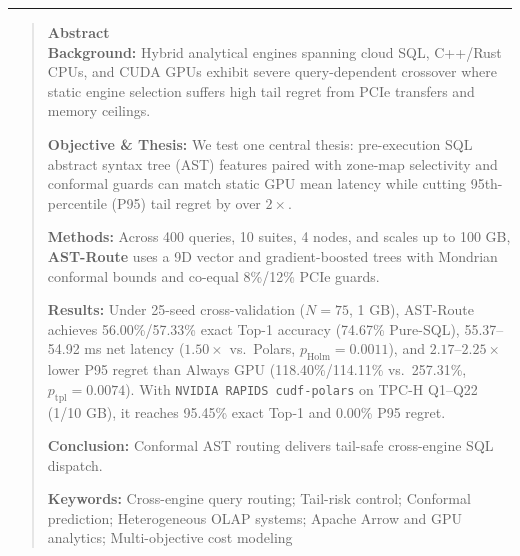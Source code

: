 \documentclass[10pt,a4paper]{article}
\begin{document}
\noindent\rule{\textwidth}{0.8pt}
\begin{quote}
\small\sffamily
\textbf{\color{springerblue}Abstract}\\[0.3em]
\textbf{Background:} Hybrid analytical engines spanning cloud SQL, C++/Rust CPUs, and CUDA GPUs exhibit severe query-dependent crossover where static engine selection suffers high tail regret from PCIe transfers and memory ceilings.

\textbf{Objective \& Thesis:} We test one central thesis: pre-execution SQL abstract syntax tree (AST) features paired with zone-map selectivity and conformal guards can match static GPU mean latency while cutting 95th-percentile (P95) tail regret by over $2\times$.

\textbf{Methods:} Across 400 queries, 10 suites, 4 nodes, and scales up to 100 GB, \textbf{AST-Route} uses a 9D vector and gradient-boosted trees with Mondrian conformal bounds and co-equal 8\%/12\% PCIe guards.

\textbf{Results:} Under 25-seed cross-validation ($N=75$, 1 GB), AST-Route achieves 56.00\%/57.33\% exact Top-1 accuracy (74.67\% Pure-SQL), 55.37--54.92 ms net latency ($1.50\times$ vs.\ Polars, $p_{\text{Holm}}=0.0011$), and $2.17\text{--}2.25\times$ lower P95 regret than Always GPU (118.40\%/114.11\% vs.\ 257.31\%, $p_{\text{tpl}}=0.0074$). With \texttt{NVIDIA RAPIDS cudf-polars} on TPC-H Q1--Q22 (1/10 GB), it reaches 95.45\% exact Top-1 and 0.00\% P95 regret.

\textbf{Conclusion:} Conformal AST routing delivers tail-safe cross-engine SQL dispatch.

\noindent\textbf{Keywords:} Cross-engine query routing; Tail-risk control; Conformal prediction; Heterogeneous OLAP systems; Apache Arrow and GPU analytics; Multi-objective cost modeling
\end{quote}
\end{document}

